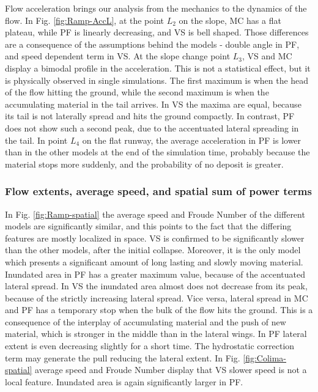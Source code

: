 \documentclass{article}
\begin{document}
Flow acceleration brings our analysis from the mechanics to the dynamics of the flow. In Fig. \ref{fig:Ramp-AccL}, at the point $L_2$ on the slope, MC has a flat plateau, while PF is linearly decreasing, and VS is bell shaped. Those differences are a consequence of the assumptions behind the models - double angle in PF, and speed dependent term in VS. At the slope change point $L_3$, VS and MC display a bimodal profile in the acceleration. This is not a statistical effect, but it is physically observed in single simulations. The first maximum is when the head of the flow hitting the ground, while the second maximum is when the accumulating material in the tail arrives. In VS the maxima are equal, because its tail is not laterally spread and hits the ground compactly. In contrast, PF does not show such a second peak, due to the accentuated lateral spreading in the tail. In point $L_4$ on the flat runway, the average acceleration in PF is lower than in the other models at the end of the simulation time, probably because the material stops more suddenly, and the probability of no deposit is greater.

\subsubsection{Flow extents, average speed, and spatial sum of power terms}
In Fig. \ref{fig:Ramp-spatial} the average speed and Froude Number of the different models are significantly similar, and this points to the fact that the differing features are mostly localized in space. VS is confirmed to be significantly slower than the other models, after the initial collapse. Moreover, it is the only model which presents a significant amount of long lasting and slowly moving material. Inundated area in PF has a greater maximum value, because of the accentuated lateral spread. In VS the inundated area almost does not decrease from its peak, because of the strictly increasing lateral spread. Vice versa, lateral spread in MC and PF has a temporary stop when the bulk of the flow hits the ground. This is a consequence of the interplay of accumulating material and the push of new material, which is stronger in the middle than in the lateral wings. In PF lateral extent is even decreasing slightly for a short time. The hydrostatic correction term may generate the pull reducing the lateral extent. In Fig. \ref{fig:Colima-spatial} average speed and Froude Number display that VS slower speed is not a local feature. Inundated area is again significantly larger in PF.
\end{document}
